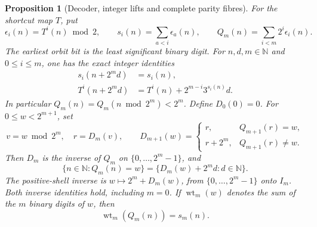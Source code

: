 \documentclass[11pt]{article}
\newtheorem{proposition}{Proposition}
\theoremstyle{remark}\newtheorem{remark}[proposition]{Remark}
\newcommand{\NN}{\mathbb N}
\begin{document}
\begin{proposition}[Decoder, integer lifts and complete parity fibres]
\label{prop:shaik-parity-decoder}
For the shortcut map \(T\), put
\[
 \epsilon_i(n)=T^i(n)\bmod2,\qquad
 s_i(n)=\sum_{a<i}\epsilon_a(n),\qquad
 Q_m(n)=\sum_{i<m}2^i\epsilon_i(n).
\]
The earliest orbit bit is the least significant binary digit. For
\(n,d,m\in\NN\) and \(0\le i\le m\), one has the exact integer identities
\begin{equation}\label{eq:shaik-parity-lift}
 \begin{split}
 s_i(n+2^m d)&=s_i(n),\\
 T^i(n+2^m d)&=T^i(n)+2^{m-i}3^{s_i(n)}d .
 \end{split}
\end{equation}
In particular \(Q_m(n)=Q_m(n\bmod2^m)<2^m\).
Define \(D_0(0)=0\). For \(0\le w<2^{m+1}\), set
\[
 v=w\bmod2^m,\quad r=D_m(v),\qquad
 D_{m+1}(w)=
 \begin{cases}
 r,&Q_{m+1}(r)=w,\\
 r+2^m,&Q_{m+1}(r)\ne w .
 \end{cases}
\]
Then \(D_m\) is the inverse of \(Q_m\) on
\(\{0,\ldots,2^m-1\}\), and
\begin{equation}\label{eq:shaik-parity-fibre}
 \{n\in\NN:Q_m(n)=w\}
   =\{D_m(w)+2^m d:d\in\NN\}.
\end{equation}
The positive-shell inverse is
\(w\mapsto2^m+D_m(w)\), from \(\{0,\ldots,2^m-1\}\) onto \(I_m\).
Both inverse identities hold, including \(m=0\).
If \(\operatorname{wt}_m(w)\) denotes the sum of the \(m\) binary
digits of \(w\), then
\[
 \operatorname{wt}_m(Q_m(n))=s_m(n).
\]
\end{proposition}
\end{document}
